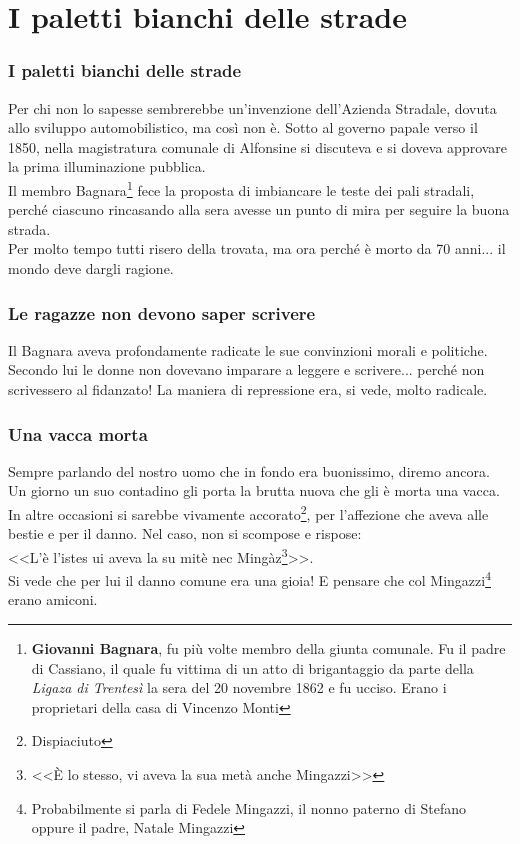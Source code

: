 
\chapter{I paletti bianchi delle strade}
\subsection{I paletti bianchi delle strade}
Per chi non lo sapesse sembrerebbe un'invenzione dell'Azienda Stradale, dovuta allo sviluppo automobilistico, ma così non è. Sotto al governo papale verso il 1850, nella magistratura comunale di Alfonsine si discuteva e si doveva approvare la prima illuminazione pubblica.\\
\indent Il membro Bagnara\footnote{\textbf{Giovanni Bagnara}, fu più volte membro della giunta comunale. Fu il padre di Cassiano, il quale fu vittima di un atto di brigantaggio  da parte della \textit{Ligaza di Trentesì} la sera del 20 novembre 1862 e fu ucciso. Erano i proprietari della casa di Vincenzo Monti} fece la proposta di imbiancare le teste dei pali stradali, perché ciascuno rincasando alla sera avesse un punto di mira per seguire la buona strada.\\
\indent Per molto tempo tutti risero della trovata, ma ora perché è morto da 70 anni... il mondo deve dargli ragione.

\subsection{Le ragazze non devono saper scrivere}
Il Bagnara aveva profondamente radicate le sue convinzioni morali e politiche. Secondo lui le donne non dovevano imparare a leggere e scrivere... perché non scrivessero al fidanzato! La maniera di repressione era, si vede, molto radicale.\\

\subsection{Una vacca morta}
Sempre parlando del nostro uomo che in fondo era buonissimo, diremo ancora.\\
\indent Un giorno un suo contadino gli porta la brutta nuova che gli è morta una vacca. In altre occasioni si sarebbe vivamente accorato\footnote{Dispiaciuto}, per l'affezione che aveva alle bestie e per il danno. Nel caso, non si scompose e rispose:\\
\indent <<L'è l'istes ui aveva la su mitè nec Mingàz\footnote{<<È lo stesso, vi aveva la sua metà anche Mingazzi>>}>>. \\
\indent Si vede che per lui il danno comune era una gioia! E pensare che col Mingazzi\footnote{Probabilmente si parla di Fedele Mingazzi, il nonno paterno di Stefano oppure il padre, Natale Mingazzi} erano amiconi.


